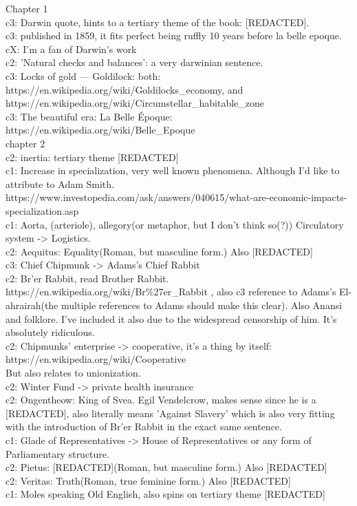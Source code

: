 Chapter 1\\[1cm]
c3: Darwin quote, hints to a tertiary theme of the book: [REDACTED].\\
c3: published in 1859, it fits perfect being ruffly 10 years before la belle epoque.\\
cX: I'm a fan of Darwin's work\\
c2: 'Natural checks and balances': a very darwinian sentence.\\
c3: Locks of gold --- Goldilock: both: https://en.wikipedia.org/wiki/Goldilocks\_economy, and https://en.wikipedia.org/wiki/Circumstellar\_habitable\_zone\\
c3: The beautiful era: La Belle Époque: https://en.wikipedia.org/wiki/Belle\_Epoque\\[1cm]
chapter 2 \\
c2: inertia: tertiary theme [REDACTED]\\
c1: Increase in specialization, very well known phenomena. Although I'd like to attribute to Adam Smith.\\ https://www.investopedia.com/ask/answers/040615/what-are-economic-impacts-specialization.asp\\
c1: Aorta, (arteriole), allegory(or metaphor, but I don't think so(?)) Circulatory system -> Logistics.\\
c2: Aequitus: Equality(Roman, but masculine form.) Also [REDACTED]\\
c3: Chief Chipmunk -> Adams's Chief Rabbit\\
c2: Br'er Rabbit, read Brother Rabbit.\\ https://en.wikipedia.org/wiki/Br\%27er\_Rabbit , also c3 reference to Adams's El-ahrairah(the multiple references to Adams should make this clear). Also Anansi and folklore. I've included it also due to the widespread censorship of him. It's absolutely ridiculous.\\
c2: Chipmunks' enterprise -> cooperative, it's a thing by itself:\\
https://en.wikipedia.org/wiki/Cooperative\\
But also relates to unionization.\\
c2: Winter Fund -> private health insurance\\
c2: Ongentheow: King of Svea. Egil Vendelcrow, makes sense since he is a [REDACTED], also literally means 'Against Slavery' which is also very fitting with the introduction of Br'er Rabbit in the exact same sentence.\\
c1: Glade of Representatives -> House of Representatives or any form of Parliamentary structure.\\
c2: Pietus: [REDACTED](Roman, but masculine form.) Also [REDACTED]\\
c2: Veritas: Truth(Roman, true feminine form.) Also [REDACTED]\\
c1: Moles speaking Old English, also spins on tertiary theme [REDACTED]

